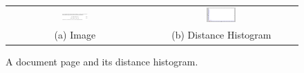 \documentclass[conference]{IEEEtran}
\begin{document}

\begin{figure}[h]
\center\footnotesize 
\begin{tabular}{|c|c|}
\hline
 \includegraphics[width=0.2\textwidth]{simage.png} &
 \includegraphics[width=0.2\textwidth]{histogram.png} \\
 (a) Image & (b) Distance Histogram\\
 \hline
\end{tabular}
\caption{ A document page and its distance histogram.}
\label{hist} 
\end{figure} 
\end{document}
